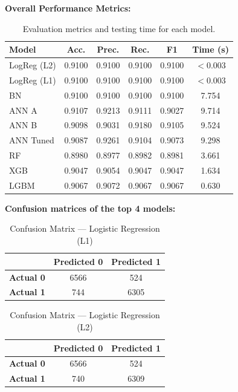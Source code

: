 \documentclass[conference]{IEEEtran}
\begin{document}
\noindent \textbf{Overall Performance Metrics:}\\
\begin{table}[H]
\centering
\label{tab:performance_metrics}
\renewcommand{\arraystretch}{1.2}
\begin{tabular}{|l|c|c|c|c|c|}
\hline
\textbf{Model} & \textbf{Acc.} & \textbf{Prec.} & \textbf{Rec.} & \textbf{F1} & \textbf{Time (s)} \\
\hline
LogReg (L2) & 0.9100 & 0.9100 & 0.9100 & 0.9100 & $<$0.003 \\
LogReg (L1) & 0.9100 & 0.9100 & 0.9100 & 0.9100 & $<$0.003 \\
BN          & 0.9100 & 0.9100 & 0.9100 & 0.9100 & 7.754 \\
ANN A       & 0.9107 & 0.9213 & 0.9111 & 0.9027 & 9.714 \\
ANN B       & 0.9098 & 0.9031 & 0.9180 & 0.9105 & 9.524 \\
ANN Tuned   & 0.9087 & 0.9261 & 0.9104 & 0.9073 & 9.298 \\
RF          & 0.8980 & 0.8977 & 0.8982 & 0.8981 & 3.661 \\
XGB         & 0.9047 & 0.9054 & 0.9047 & 0.9047 & 1.634 \\
LGBM        & 0.9067 & 0.9072 & 0.9067 & 0.9067 & 0.630 \\
\hline
\end{tabular}
\caption{Evaluation metrics and testing time for each model.}
\end{table}

\vspace{1em}

\noindent \textbf{Confusion matrices of the top 4 models:}\\
\begin{table}[htbp]
\centering
\label{tab:conf_matrix_l1}
\renewcommand{\arraystretch}{1.5}
\begin{tabular}{|c|c|c|}
\hline
\textbf{} & \textbf{Predicted 0} & \textbf{Predicted 1} \\
\hline
\textbf{Actual 0} & 6566 & 524 \\
\hline
\textbf{Actual 1} & 744 & 6305 \\
\hline
\end{tabular}
\caption{Confusion Matrix — Logistic Regression (L1)}
\end{table}

\vspace{1em}

\begin{table}[htbp]
\centering
\label{tab:conf_matrix_l2}
\renewcommand{\arraystretch}{1.5}
\begin{tabular}{|c|c|c|}
\hline
\textbf{} & \textbf{Predicted 0} & \textbf{Predicted 1} \\
\hline
\textbf{Actual 0} & 6566 & 524 \\
\hline
\textbf{Actual 1} & 740 & 6309 \\
\hline
\end{tabular}
\caption{Confusion Matrix — Logistic Regression (L2)}
\end{table}
\end{document}
